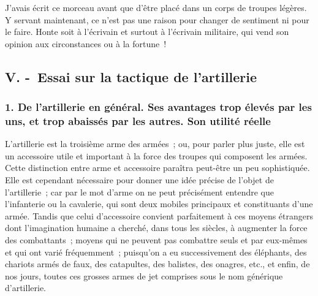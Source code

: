 \documentclass[french,twoside]{book} %
\begin{document}
J’avais écrit ce morceau avant que d’être placé dans un corps de troupes légères. Y servant maintenant, ce n’est pas une raison pour changer de sentiment ni pour le faire. Honte soit à l’écrivain et surtout à l’écrivain militaire, qui vend son opinion aux circonstances ou à la fortune !
\subsection[{V. - Essai sur la tactique de l’artillerie}]{V. - Essai sur la tactique de l’artillerie}
\subsubsection[{1. De l’artillerie en général. Ses avantages trop élevés par les uns, et trop abaissés par les autres. Son utilité réelle}]{1. De l’artillerie en général. Ses avantages trop élevés par les uns, et trop abaissés par les autres. Son utilité réelle}
\noindent L’artillerie est la troisième arme des armées ; ou, pour parler plus juste, elle est un accessoire utile et important à la force des troupes qui composent les armées. Cette distinction entre arme et accessoire paraîtra peut-être un peu sophistiquée. Elle est cependant nécessaire pour donner une idée précise de l’objet de l’artillerie ; car par le mot d’arme on ne peut précisément entendre que l’infanterie ou la cavalerie, qui sont deux mobiles principaux et constituants d’une armée. Tandis que celui d’accessoire convient parfaitement à ces moyens étrangers dont l’imagination humaine a cherché, dans tous les siècles, à augmenter la force des combattants ; moyens qui ne peuvent pas combattre seuls et par eux-mêmes et qui ont varié fréquemment ; puisqu’on a eu successivement des éléphants, des chariots armés de faux, des catapultes, des balistes, des onagres, etc., et enfin, de nos jours, toutes ces grosses armes de jet comprises sous le nom générique d’artillerie.\par
\end{document}
